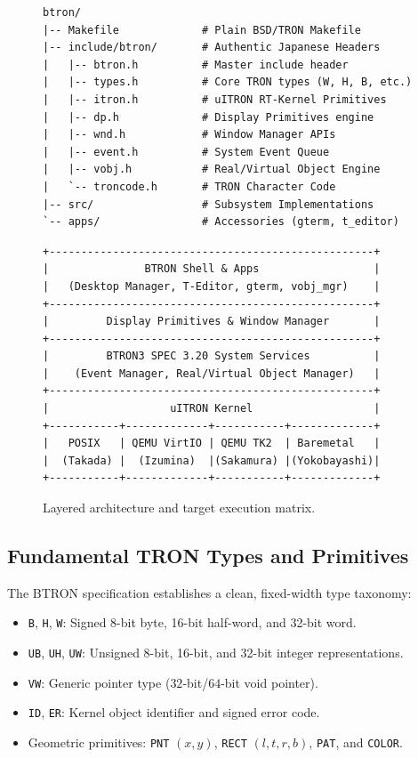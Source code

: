 \documentclass[10pt,journal,compsoc,twocolumn]{article}
\begin{document}
\begin{figure}[htbp]
\centering
\begin{minipage}{0.48\textwidth}
\begin{lstlisting}
btron/
|-- Makefile             # Plain BSD/TRON Makefile
|-- include/btron/       # Authentic Japanese Headers
|   |-- btron.h          # Master include header
|   |-- types.h          # Core TRON types (W, H, B, etc.)
|   |-- itron.h          # uITRON RT-Kernel Primitives
|   |-- dp.h             # Display Primitives engine
|   |-- wnd.h            # Window Manager APIs
|   |-- event.h          # System Event Queue
|   |-- vobj.h           # Real/Virtual Object Engine
|   `-- troncode.h       # TRON Character Code
|-- src/                 # Subsystem Implementations
`-- apps/                # Accessories (gterm, t_editor)
\end{lstlisting}
\caption{Authentic BTRON subsystem and header tree structure.}
\label{fig:source_tree}
\end{minipage}\hfill
\begin{minipage}{0.48\textwidth}
\begin{lstlisting}
+---------------------------------------------------+
|               BTRON Shell & Apps                  |
|   (Desktop Manager, T-Editor, gterm, vobj_mgr)    |
+---------------------------------------------------+
|         Display Primitives & Window Manager       |
+---------------------------------------------------+
|         BTRON3 SPEC 3.20 System Services          |
|    (Event Manager, Real/Virtual Object Manager)   |
+---------------------------------------------------+
|                   uITRON Kernel                   |
+-----------+-------------+-----------+-------------+
|   POSIX   | QEMU VirtIO | QEMU TK2  | Baremetal   |
|  (Takada) |  (Izumina)  |(Sakamura) |(Yokobayashi)|
+-----------+-------------+-----------+-------------+
\end{lstlisting}
\caption{Layered architecture and target execution matrix.}
\label{fig:arch_layers}
\end{minipage}
\end{figure}

\subsection{Fundamental TRON Types and Primitives}
The BTRON specification establishes a clean, fixed-width type taxonomy:
\begin{itemize}[leftmargin=*]
    \item \texttt{B}, \texttt{H}, \texttt{W}: Signed 8-bit byte, 16-bit half-word, and 32-bit word.
    \item \texttt{UB}, \texttt{UH}, \texttt{UW}: Unsigned 8-bit, 16-bit, and 32-bit integer representations.
    \item \texttt{VW}: Generic pointer type ($32$-bit/$64$-bit void pointer).
    \item \texttt{ID}, \texttt{ER}: Kernel object identifier and signed error code.
    \item Geometric primitives: \texttt{PNT} $(x, y)$, \texttt{RECT} $(l, t, r, b)$, \texttt{PAT}, and \texttt{COLOR}.
\end{itemize}
\end{document}
